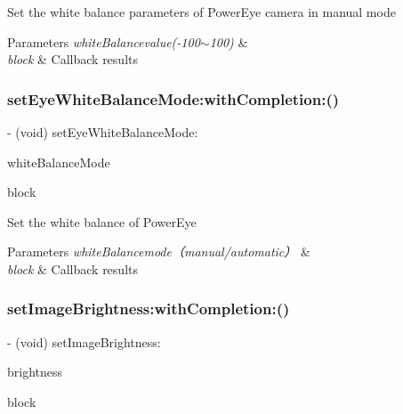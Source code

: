 Set the white balance parameters of Power\+Eye camera in manual mode


\begin{DoxyParams}{Parameters}
{\em white\+Balancevalue(-\/100$\sim$100)} & \\
\hline
{\em block} & Callback results \\
\hline
\end{DoxyParams}
\mbox{\label{interface_p_v_camera_aaea924d3c945f1cac7fe8bdc4433fff1}} 
\subsubsection{\texorpdfstring{set\+Eye\+White\+Balance\+Mode\+:with\+Completion\+:()}{setEyeWhiteBalanceMode:withCompletion:()}}
{\footnotesize\ttfamily -\/ (void) set\+Eye\+White\+Balance\+Mode\+: \begin{DoxyParamCaption}\item[{(P\+V\+Eye\+Camera\+White\+Balance\+Mode)}]{white\+Balance\+Mode }\item[{withCompletion:(P\+V\+Completion\+Block)}]{block }\end{DoxyParamCaption}}

Set the white balance of Power\+Eye


\begin{DoxyParams}{Parameters}
{\em white\+Balancemode（manual/automatic）} & \\
\hline
{\em block} & Callback results \\
\hline
\end{DoxyParams}
\mbox{\label{interface_p_v_camera_a3da42da7c06e424a411c3055b8d1ff26}} 
\subsubsection{\texorpdfstring{set\+Image\+Brightness\+:with\+Completion\+:()}{setImageBrightness:withCompletion:()}}
{\footnotesize\ttfamily -\/ (void) set\+Image\+Brightness\+: \begin{DoxyParamCaption}\item[{(N\+S\+Integer)}]{brightness }\item[{withCompletion:(P\+V\+Completion\+Block)}]{block }\end{DoxyParamCaption}}

